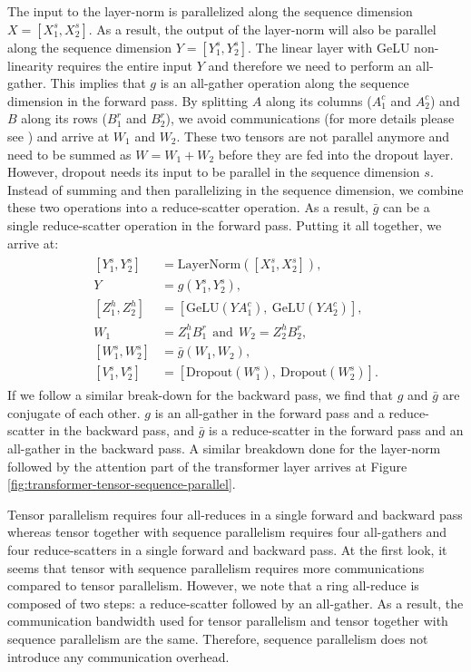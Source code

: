\documentclass{article}
\begin{document}
The input to the layer-norm is parallelized along the sequence dimension $X=[X_1^s, X_2^s]$. As a result, the output of the layer-norm will also be parallel along the sequence dimension $Y = [Y_1^s, Y_2^s]$. The linear layer with GeLU non-linearity requires the entire input $Y$ and therefore we need to perform an all-gather. This implies that $g$ is an all-gather operation along the sequence dimension in the forward pass. By splitting $A$ along its columns ($A_1^c$ and $A_2^c$) and $B$ along its rows ($B_1^r$ and $B_2^r$), we avoid communications (for more details please see \cite{megatron}) and arrive at $W_1$ and $W_2$. These two tensors are not parallel anymore and need to be summed as $W = W_1 + W_2$ before they are fed into the dropout layer. However, dropout needs its input to be parallel in the sequence dimension $s$. Instead of summing and then parallelizing in the sequence dimension, we combine these two operations into a reduce-scatter operation. As a result, $\bar{g}$ can be a single reduce-scatter operation in the forward pass. Putting it all together, we arrive at:
\begin{align}
    \begin{split}
        [Y_1^s, Y_2^s] &= \text{LayerNorm}([X_1^s, X_2^s]), \\
        Y &= g(Y_1^s, Y_2^s), \\
        [Z_1^h, Z_2^h] &= [\text{GeLU}(YA_1^c),\ \text{GeLU}(YA_2^c)], \\
        W_1 &= Z_1^hB_1^r \ \  \text{and} \ \  W_2=Z_2^hB_2^r, \\
        [W_1^s, W_2^s] &= \bar{g}(W_1, W_2), \\
        [V_1^s, V_2^s] &= [\text{Dropout}(W_1^s),\ \text{Dropout}(W_2^s)].
    \end{split}
    \label{eq:mlp-split}
\end{align}
If we follow a similar break-down for the backward pass, we find that $g$ and $\bar{g}$ are conjugate of each other. $g$ is an all-gather in the forward pass and a reduce-scatter in the backward pass, and $\bar{g}$ is a reduce-scatter in the forward pass and an all-gather in the backward pass. A similar breakdown done for the layer-norm followed by the attention part of the transformer layer arrives at Figure \ref{fig:transformer-tensor-sequence-parallel}.

Tensor parallelism requires four all-reduces in a single forward and backward pass whereas tensor together with sequence parallelism requires four all-gathers and four reduce-scatters in a single forward and backward pass. At the first look, it seems that tensor with sequence parallelism requires more communications compared to tensor parallelism. However, we note that a ring all-reduce is composed of two steps: a reduce-scatter followed by an all-gather. As a result, the communication bandwidth used for tensor parallelism and tensor together with sequence parallelism are the same. Therefore, sequence parallelism does not introduce any communication overhead.
\end{document}
